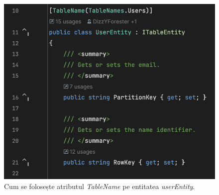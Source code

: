 \begin{figure}[H]
    \centering
    \includegraphics[width=14cm]{Assets/userEntity.png}
    \caption{Cum se folosește atributul \textit{TableName} pe entitatea \textit{userEntity}.}
    \label{fig:userEntity}
\end{figure}
